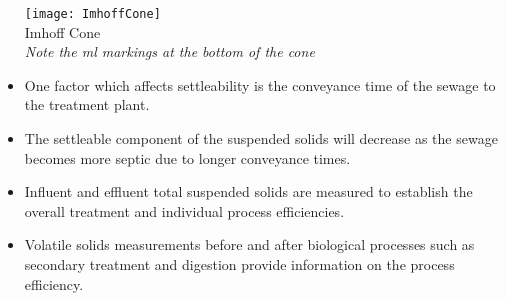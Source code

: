 \documentclass{article}
\begin{document}
\begin{itemize}
\begin{minipage}{0.5\textwidth}
			      \end{minipage}	
			      \begin{minipage}{0.5\textwidth}
			      	\begin{center}
			      		\texttt{[image: ImhoffCone]}\\
			      		Imhoff Cone\\
			      		\textit{Note the ml markings at the bottom of the cone}
			      		
			      		
			      	\end{center}
		      \end{minipage}
			      	\item One factor which affects settleability is the conveyance time of the sewage to the treatment plant. 			
			      	\item The settleable component of the suspended solids will decrease as the sewage becomes more septic due to longer conveyance times.
			\item Influent and effluent total suspended solids are measured to establish the overall treatment and individual process efficiencies.  
			\item Volatile solids measurements before and after biological processes such as secondary treatment and digestion provide information on the process efficiency.\\
		\end{itemize}

\end{document}
